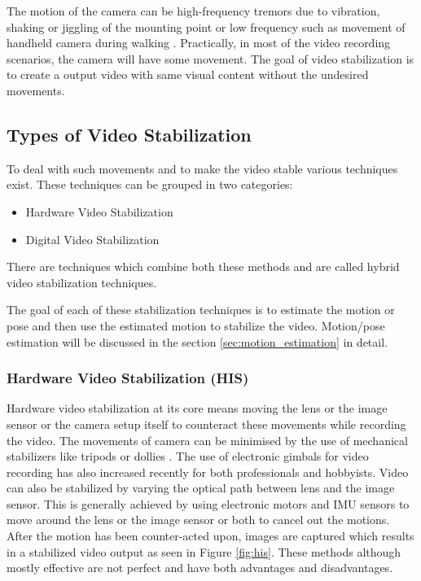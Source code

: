 The motion of the camera can be high-frequency tremors due to vibration, shaking or jiggling of the mounting point \citep{ryu2012robust} or low frequency such as movement of handheld camera during walking \citep{dis_review}. Practically, in most of the video recording scenarios, the camera will have some movement. The goal of video stabilization is to create a output video with same visual content without the undesired movements. 

\subsection{Types of Video Stabilization}
To deal with such movements and to make the video stable various techniques exist. These techniques can be grouped in two categories:

\begin{itemize}
\item Hardware Video Stabilization
\item Digital Video Stabilization  
\end{itemize}
There are techniques which combine both these methods and are called hybrid video stabilization techniques.

The goal of each of these stabilization techniques is to estimate the motion or pose and then use the estimated motion to stabilize the video. Motion/pose estimation will be discussed in the section \ref{sec:motion_estimation} in detail.


\subsubsection{Hardware Video Stabilization (HIS)}
Hardware video stabilization at its core means moving the lens or the image sensor or the camera setup itself to counteract these movements while recording the video. The movements of camera can be minimised by the use of mechanical stabilizers like tripods or dollies \citep{5995525}. The use of electronic gimbals for video recording has also increased recently for both professionals and hobbyists. Video can also be stabilized by varying the optical path between lens and the image sensor. This is generally achieved by using electronic motors and IMU sensors to move around the lens or the image sensor or both to cancel out the motions. After the motion has been counter-acted upon, images are captured which results in a stabilized video output as seen in Figure \ref{fig:his}. These methods although mostly effective are not perfect and have both advantages and disadvantages.


